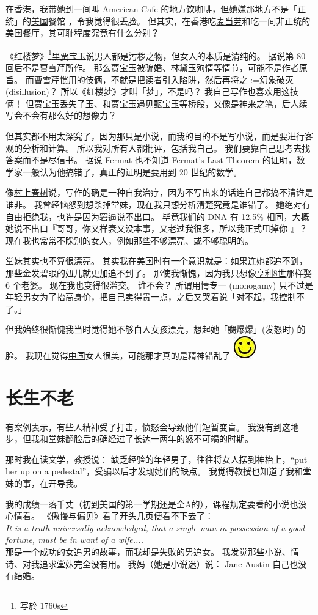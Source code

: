 \documentclass[12pt]{report}
\makeatletter
\renewcommand{\d}[1]{$\underaccent{\scalebox{0.5}{\textbullet}}{\textrm{#1}}$}
\newcommand{\ds}[1]{%
  \@tfor\next:=#1\do{\d{\next}}}
\newcommand*\smiley{\includegraphics[scale=0.5]{smiley.jpg}}
\makeatother
\begin{document}
在香港，我带她到一间叫 American Cafe 的地方饮咖啡，但她嫌那地方不是「正统」的\uline{美国}餐馆 ，令我觉得很丢脸。 但其实，在香港吃\uline{麦当劳}和吃一间非正统的\uline{美国}餐厅，其可耻程度究竟有什么分别？

《红楼梦》\footnote{写於 1760s}里\uline{贾宝玉}说男人都是污秽之物，但女人的本质是清纯的。 据说第 80 回后不是\uline{曹雪芹}所作。 那么\uline{贾宝玉}被骗婚、\uline{林黛玉}殉情等情节，可能不是作者原旨。 而\uline{曹雪芹}惯用的伎俩，不就是把读者引入陷阱，然后再将之\ds{幻象破灭}(disillusion)？ 所以《红楼梦》才叫「梦」，不是吗？ 我自己写作也喜欢用这技俩！ 但\uline{贾宝玉}丢失了玉、和\uline{贾宝玉}遇见\uline{甄宝玉}等桥段，又像是神来之笔，后人续写会不会有那么好的想像力？

但其实都不用太深究了，因为那只是小说，而我的目的不是写小说，而是要进行客观的分析和计算。 所以我对所有人都批评，包括我自己。 我们要靠自己思考去找答案而不是尽信书。 据说 Fermat 也不知道 Fermat's Last Theorem 的证明，数学家一般认为他搞错了，真正的证明是要用到 20 世纪的数学。

像\uline{村上春树}说，写作的确是一种自我治疗，因为不写出来的话连自己都搞不清谁是谁非。 我曾经恼怒到想杀掉堂妹，现在我只想分析清楚究竟是谁错了。 她绝对有自由拒绝我，也许是因为窘逼说不出口。 毕竟我们的 DNA 有 12.5\% 相同，大概她说不出口『哥哥，你又样衰又没本事，又老过我很多，所以我正式甩掉你 』？ 现在我也常常不睬别的女人，例如那些不够漂亮、或不够聪明的。

堂妹其实也不算很漂亮。 其实我在\uline{美国}时有一个意识就是：如果连她都追不到，那些金发碧眼的妞儿就更加追不到了。 那使我惭愧，因为我只想像\uline{亨利8世}那样娶 6 个老婆。 现在我也变得很滥交。 谁不会？  所谓用情专一 (monogamy) 只不过是年轻男女为了抬高身价，把自己卖得贵一点，之后又哭着说「对不起，我控制不了。」

但我始终很惭愧我当时觉得她不够白人女孩漂亮，想起她「嬲爆爆」(发怒时) 的脸。 我现在觉得\uline{中国}女人很美，可能那才真的是精神错乱了 \smiley

\chapter{长生不老}

有案例表示，有些人精神受了打击，愤怒会导致他们短暂变盲。 我没有到这地步，但我和堂妹翻脸后的确经过了长达一两年的怒不可竭的时期。

那时我在读文学，教授说： 缺乏经验的年轻男子，往往将女人摆到神枱上，``put her up on a pedestal''，受骗以后才发现她们的缺点。  我觉得教授也知道了我和堂妹的事，在开导我。

我的成绩一落千丈（初到美国的第一学期还是全A的），课程规定要看的小说也没心情看。 《傲慢与偏见》看了开头几页便看不下去了： \\
\textit{It is a truth universally acknowledged, that a single man in possession of a good fortune, must be in want of a wife....} \\
那是一个成功的女追男的故事，而我却是失败的男追女。 我发觉那些小说、情诗、对我追求堂妹完全没有用。 我妈（她是小说迷）说： Jane Austin 自己也没有结婚。
\end{document}
